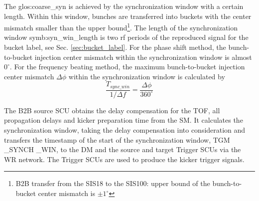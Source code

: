 The \gls{glos:coarse_syn} is achieved by the synchronization window with a certain length. Within this window, bunches are transferred into buckets with the center mismatch smaller than the upper bound\footnote{B2B transfer from the SIS18 to the SIS100: upper bound of the bunch-to-bucket center mismatch is $\pm1^\circ$}. The length of the synchronization window \gls{symb:syn_win_length} is two rf periods of the reproduced signal for the bucket label, see Sec. \ref{sec:bucket_label}. For the phase shift method, the bunch-to-bucket injection center mismatch within the synchronization window is almost $0^\circ$. For the frequency beating method, the maximum bunch-to-bucket injection center mismatch $\Delta \phi$ within the synchronization window is calculated by 
\begin{equation}
\frac{T_{\mathit{sync\_win}}}{1/\Delta f}= \frac{\Delta \phi}{360^\circ}
\end{equation}

The B2B source SCU obtains the delay compensation for the TOF, all propagation delays and kicker preparation time from the SM. It calculates the synchronization window, taking the delay compensation into consideration and transfers the timestamp of the start of the synchronization window, TGM \_SYNCH \_WIN, to the DM and the source and target Trigger SCUs via the WR network. The Trigger SCUs are used to produce the kicker trigger signals. 

